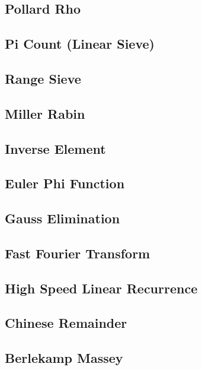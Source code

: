 \documentclass[a4paper,10pt,twocolumn,oneside]{article}
\begin{document}
\subsection{Pollard Rho}

\subsection{Pi Count (Linear Sieve)}

\subsection{Range Sieve}

\subsection{Miller Rabin}

\subsection{Inverse Element}

\subsection{Euler Phi Function}

\subsection{Gauss Elimination}

\subsection{Fast Fourier Transform}

\subsection{High Speed Linear Recurrence}

\subsection{Chinese Remainder}

\subsection{Berlekamp Massey}

\end{document}
